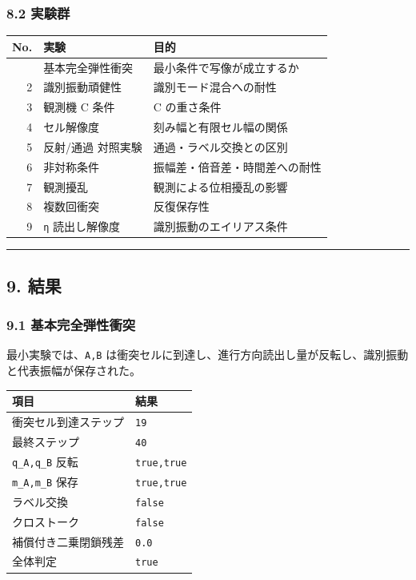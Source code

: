 \documentclass[
  a4paper,
]{article}
\newcounter{none} %
\begin{document}
\subsubsection{8.2 実験群}\label{ux5b9fux9a13ux7fa4}

{\def\LTcaptype{none} %
\begin{longtable}[]{@{}rll@{}}
\toprule\noalign{}
No. & 実験 & 目的 \\
\midrule\noalign{}
\endhead
\bottomrule\noalign{}
\endlastfoot
1 & 基本完全弾性衝突 & 最小条件で写像が成立するか \\
2 & 識別振動頑健性 & 識別モード混合への耐性 \\
3 & 観測機 C 条件 & C の重さ条件 \\
4 & セル解像度 & 刻み幅と有限セル幅の関係 \\
5 & 反射/通過 対照実験 & 通過・ラベル交換との区別 \\
6 & 非対称条件 & 振幅差・倍音差・時間差への耐性 \\
7 & 観測擾乱 & 観測による位相擾乱の影響 \\
8 & 複数回衝突 & 反復保存性 \\
9 & \texttt{η} 読出し解像度 & 識別振動のエイリアス条件 \\
\end{longtable}
}

\begin{center}\rule{0.5\linewidth}{0.5pt}\end{center}

\subsection{9. 結果}\label{ux7d50ux679c}

\subsubsection{9.1
基本完全弾性衝突}\label{ux57faux672cux5b8cux5168ux5f3eux6027ux885dux7a81}

最小実験では、\texttt{A,B}
は衝突セルに到達し、進行方向読出し量が反転し、識別振動と代表振幅が保存された。

{\def\LTcaptype{none} %
\begin{longtable}[]{@{}ll@{}}
\toprule\noalign{}
項目 & 結果 \\
\midrule\noalign{}
\endhead
\bottomrule\noalign{}
\endlastfoot
衝突セル到達ステップ & \texttt{19} \\
最終ステップ & \texttt{40} \\
\texttt{q\_A,q\_B} 反転 & \texttt{true,true} \\
\texttt{m\_A,m\_B} 保存 & \texttt{true,true} \\
ラベル交換 & \texttt{false} \\
クロストーク & \texttt{false} \\
補償付き二乗閉鎖残差 & \texttt{0.0} \\
全体判定 & \texttt{true} \\
\end{longtable}
}
\end{document}
